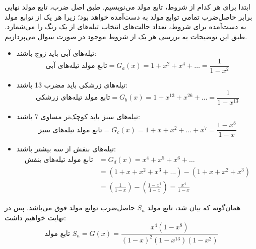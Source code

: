 \p
 ابتدا برای هر کدام از شروط، تابع مولد می‌نویسیم. طبق اصل ضرب،
  تابع مولد نهایی برابر حاصل‌ضرب تمامی  توابع مولد به دست‌آمده خواهد بود؛
    زیرا هر یک از توابع مولد به دست‌آمده برای شروط، تعداد حالت‌های انتخاب‌ تیله‌های از یک رنگ را می‌شمارد.  
   طبق این توضیحات به بررسی هر یک از شروط موجود در صورت سوال می‌پردازیم.
\begin{itemize}
    \item 
    تیله‌های آبی باید زوج باشند:
    $$\text{تابع مولد تیله‌های آبی} = G_a(x) = 1 + x^2 + x^4 + \ldots = \frac{1}{1-x^2}$$
    \item
    تیله‌های زرشکی باید مضرب 13 باشند:
    $$\text{تابع مولد تیله‌های زرشکی} = G_b(x) = 1 + x^{13} + x^{26} + \ldots = \frac{1}{1-x^{13}}$$
    \item
    تیله‌های سبز باید کوچک‌تر مساوی 7 باشند:
    $$\text{تابع مولد تیله‌های سبز} = G_c(x) = 1 + x + x^2 + \ldots + x^7 = \frac{1-x^8}{1-x}$$
    \item
    تیله‌های بنفش از سه بیشتر باشند:
    \begin{align*}
    \text{تابع مولد تیله‌های بنفش} &= G_d(x) = x^4 + x^5 + x^6 + \ldots\\
    &= (1+x+x^2+x^3+\ldots) - (1 + x + x^2 + x^3)\\
    &= (\frac{1}{1-x}) - (\frac{1-x^4}{1-x}) = \frac{x^4}{1-x}
    \end{align*}
\end{itemize}
\p
  همان‌گونه که بیان شد، تابع مولد
$S_n$
حاصل‌ضرب توابع مولد فوق می‌باشد. پس در نهایت خواهیم داشت:
$$\text{تابع مولد $S_n$} = G(x) = \frac{x^4(1-x^8)}{(1-x)^2(1-x^{13})(1-x^{2})}$$